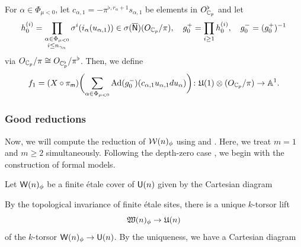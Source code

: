 \documentclass[12pt,reqno]{amsart}
\begin{document}
\begin{defi} \label{defi:constant_c_alpha_m=1}
    For $\alpha \in \Phi_{\mu<0}$, let $c_{\alpha, 1} = - \pi^{\flat, r_\alpha + 1} s_{\alpha, 1}$ be elements in $O_{\mathbb{C}_p}^\flat$ and let 
    \[
        h_0^{(i)} = \prod_{\substack{\alpha \in \Phi_{\mu < 0} \\ i \leq n_{\gamma_\alpha}}} \sigma^i(i_\alpha(u_{\alpha, 1})) \in \sigma({\mathsf{{\overline{N}}}})(O_{\mathbb{C}_p} / \pi), \quad g^+_0 = \prod_{i \geq 1} h_0^{(i)}, \quad g_0^- = (g_0^+)^{-1}
    \]
    via $O_{\mathbb{C}_p}/\pi \cong O_{\mathbb{C}_p^\flat}/\pi^\flat$. Then, we define
    \[
        f_1 = (X \circ \pi_{{\mathsf{m}}})\biggl(\sum_{\alpha \in \Phi_{\mu < 0}} {\operatorname{Ad}}(g^-_0)(c_{\alpha, 1} u_{\alpha, 1} du_\alpha)\biggr) \colon {\mathfrak{U}}(1) \otimes (O_{\mathbb{C}_p}/\pi) \to \mathbb{A}^1. 
    \]
\end{defi}

\subsubsection{Good reductions}

Now, we will compute the reduction of ${\mathcal{W}}(n)_\phi$ using  and . Here, we treat $m = 1$ and $m \geq 2$ simultaneously. Following the depth-zero case \cite[Theorem 3.16]{Tak25z}, we begin with the construction of formal models. 

\begin{defi} \label{defi:reduction_of_specaff_odd}
    Let ${\mathsf{W}}(n)_\phi$ be a finite \'{e}tale cover of ${\mathsf{U}}(n)$ given by the Cartesian diagram
    \begin{center}
    \end{center}
    By the topological invariance of finite \'{e}tale sites, there is a unique $k$-torsor lift
    \[
        {\mathfrak{W}}(n)_\phi \to {\mathfrak{U}}(n)
    \]
    of the $k$-torsor ${\mathsf{W}}(n)_\phi \to {\mathsf{U}}(n)$. By the uniqueness, we have a Cartesian diagram
    \begin{center}
    \end{center}
\end{defi}
\end{document}
